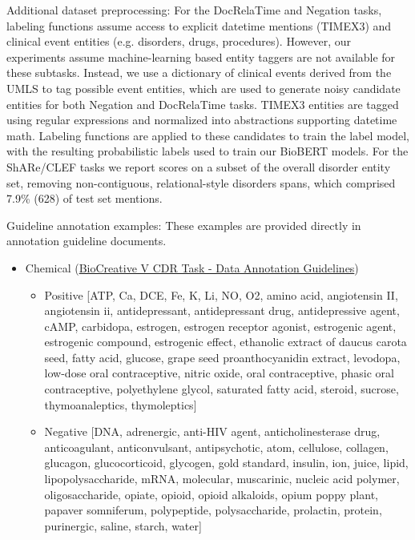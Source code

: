 \documentclass{article}
\begin{document}
Additional dataset preprocessing: For the DocRelaTime and Negation tasks, labeling functions assume access to explicit datetime mentions (TIMEX3) and clinical event entities (e.g. disorders, drugs, procedures). 
However, our experiments assume machine-learning based entity taggers are not available for these subtasks. 
Instead, we use a dictionary of clinical events derived from the UMLS to tag possible event entities, which are used to generate noisy candidate entities for both Negation and DocRelaTime tasks.
TIMEX3 entities are tagged using regular expressions and normalized into abstractions supporting datetime math.
Labeling functions are applied to these candidates to train the label model, with the resulting probabilistic labels used to train our BioBERT models.
For the ShARe/CLEF tasks we report scores on a subset of the overall disorder entity set, removing non-contiguous, relational-style disorders spans, which comprised 7.9\% (628) of test set mentions.


Guideline annotation examples: These examples are provided directly in annotation guideline documents. 

\begin{itemize}
\item Chemical 
(\href{https://biocreative.bioinformatics.udel.edu/media/store/files/2015/bc5_CDR_data_guidelines.pdf}{BioCreative V CDR Task - Data Annotation Guidelines})
\begin{itemize}
\item Positive
[ATP, Ca, DCE, Fe, K, Li, NO, O2, amino acid, angiotensin II, angiotensin ii, antidepressant, antidepressant drug, antidepressive agent, cAMP, carbidopa, estrogen, estrogen receptor agonist, estrogenic agent, estrogenic compound, estrogenic effect, ethanolic extract of daucus carota seed, fatty acid, glucose, grape seed proanthocyanidin extract, levodopa, low-dose oral contraceptive, nitric oxide, oral contraceptive, phasic oral contraceptive, polyethylene glycol, saturated fatty acid, steroid, sucrose, thymoanaleptics, thymoleptics]
\item Negative
[DNA, adrenergic, anti-HIV agent, anticholinesterase drug, anticoagulant, anticonvulsant, antipsychotic, atom, cellulose, collagen, glucagon, glucocorticoid, glycogen, gold standard, insulin, ion, juice, lipid, lipopolysaccharide, mRNA, molecular, muscarinic, nucleic acid polymer, oligosaccharide, opiate, opioid, opioid alkaloids, opium poppy plant, papaver somniferum, polypeptide, polysaccharide, prolactin, protein, purinergic, saline, starch, water]
\end{itemize}
\end{itemize}
\end{document}

